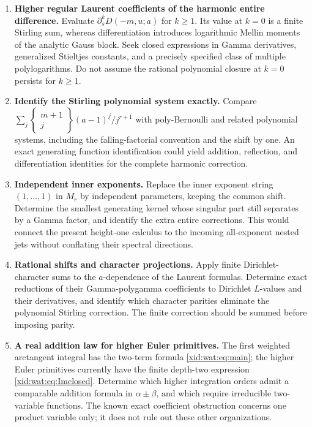 \begin{enumerate}[label=\textbf{Q\arabic*.},leftmargin=*]
\item \textbf{Higher regular Laurent coefficients of the harmonic
entire difference.}
Evaluate $\partial_s^kD(-m,u;a)$ for $k\ge1$. Its value at $k=0$
is a finite Stirling sum, whereas differentiation introduces logarithmic
Mellin moments of the analytic Gauss block. Seek closed expressions in
Gamma derivatives, generalized Stieltjes constants, and a precisely
specified class of multiple polylogarithms. Do not assume the rational
polynomial closure at $k=0$ persists for $k\ge1$.

\item \textbf{Identify the Stirling polynomial system exactly.}
Compare
$\sum_j\left\{\begin{smallmatrix}m+1\\j\end{smallmatrix}\right\}
(a-1)^{\underline j}/j^{r+1}$
with poly-Bernoulli and related polynomial systems, including the
falling-factorial convention and the shift by one. An exact generating
function identification could yield addition, reflection, and
differentiation identities for the complete harmonic correction.

\item \textbf{Independent inner exponents.}
Replace the inner exponent string $(1,\ldots,1)$ in $M_r$ by independent
parameters, keeping the common shift. Determine the smallest generating
kernel whose singular part still separates by a Gamma factor, and
identify the extra entire corrections. This would connect the present
height-one calculus to the incoming all-exponent nested jets without
conflating their spectral directions.

\item \textbf{Rational shifts and character projections.}
Apply finite Dirichlet-character sums to the $a$-dependence of the
Laurent formulas. Determine exact reductions of their Gamma-polygamma
coefficients to Dirichlet $L$-values and their derivatives, and identify
which character parities eliminate the polynomial Stirling correction.
The finite correction should be summed before imposing parity.

\item \textbf{A real addition law for higher Euler primitives.}
The first weighted arctangent integral has the two-term formula
\eqref{xid:wat:eq:main}; the higher Euler primitives currently have the
finite depth-two expression \eqref{xid:wat:eq:Imclosed}. Determine which
higher integration orders admit a comparable addition formula in
$\alpha\pm\beta$, and which require irreducible two-variable functions.
The known exact coefficient obstruction concerns one product variable
only; it does not rule out these other organizations.


\end{enumerate}
